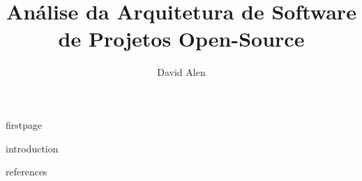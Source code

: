 \documentclass[12pt]{article}
\title{Análise da Arquitetura de Software de Projetos Open-Source}
\author{David Alen}
\begin{document}
{firstpage}

{introduction}

{references}
\end{document}
